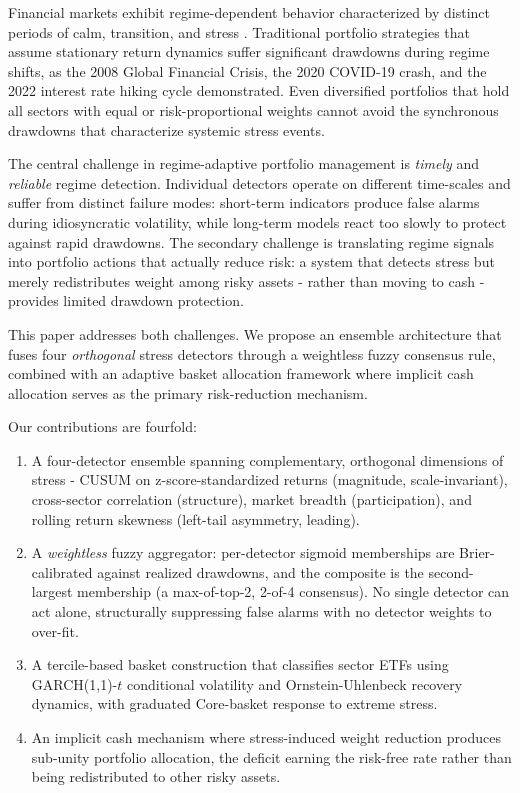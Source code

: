 \documentclass[11pt]{article}
\begin{document}
Financial markets exhibit regime-dependent behavior characterized by
distinct periods of calm, transition, and stress
\citep{hamilton1989}.  Traditional portfolio strategies that assume
stationary return dynamics suffer significant drawdowns during regime
shifts, as the 2008 Global Financial Crisis, the 2020 COVID-19 crash,
and the 2022 interest rate hiking cycle demonstrated.  Even
diversified portfolios that hold all sectors with equal or
risk-proportional weights cannot avoid the synchronous drawdowns
that characterize systemic stress events.

The central challenge in regime-adaptive portfolio management is
\emph{timely} and \emph{reliable} regime detection.  Individual
detectors operate on different time-scales and suffer from distinct
failure modes: short-term indicators produce false alarms during
idiosyncratic volatility, while long-term models react too slowly to
protect against rapid drawdowns.  The secondary challenge is
translating regime signals into portfolio actions that actually reduce
risk: a system that detects stress but merely redistributes weight
among risky assets - rather than moving to cash - provides limited
drawdown protection.

This paper addresses both challenges.  We propose an ensemble
architecture that fuses four \emph{orthogonal} stress detectors through
a weightless fuzzy consensus rule, combined with an adaptive basket
allocation framework where implicit cash allocation serves as the
primary risk-reduction mechanism.

Our contributions are fourfold:
\begin{enumerate}[itemsep=2pt]
    \item A four-detector ensemble spanning complementary, orthogonal
          dimensions of stress - CUSUM on z-score-standardized returns
          (magnitude, scale-invariant), cross-sector correlation
          (structure), market breadth (participation), and rolling
          return skewness (left-tail asymmetry, leading).
    \item A \emph{weightless} fuzzy aggregator: per-detector sigmoid
          memberships are Brier-calibrated against realized drawdowns,
          and the composite is the second-largest membership (a
          max-of-top-2, 2-of-4 consensus). No single detector can act
          alone, structurally suppressing false alarms with no detector
          weights to over-fit.
    \item A tercile-based basket construction that classifies sector
          ETFs using GARCH(1,1)-$t$ conditional volatility and
          Ornstein-Uhlenbeck recovery dynamics, with graduated
          Core-basket response to extreme stress.
    \item An implicit cash mechanism where stress-induced weight
          reduction produces sub-unity portfolio allocation, the
          deficit earning the risk-free rate rather than being
          redistributed to other risky assets.
\end{enumerate}
\end{document}
